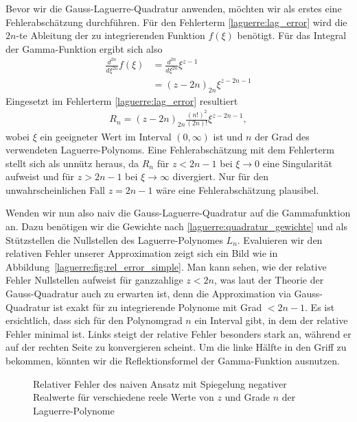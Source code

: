 Bevor wir die Gauss-Laguerre-Quadratur anwenden,
möchten wir als erstes eine Fehlerabschätzung durchführen.
Für den Fehlerterm \eqref{laguerre:lag_error} wird die $2n$-te Ableitung
der zu integrierenden Funktion $f(\xi)$ benötigt.
Für das Integral der Gamma-Funktion ergibt sich also
\begin{align*}
\frac{d^{2n}}{d\xi^{2n}} f(\xi)
 & =
\frac{d^{2n}}{d\xi^{2n}} \xi^{z-1}
\\
 & =
(z - 2n)_{2n} \xi^{z - 2n - 1}
\end{align*}
Eingesetzt im Fehlerterm \eqref{laguerre:lag_error} resultiert
\begin{align*}
R_n
=
(z - 2n)_{2n} \frac{(n!)^2}{(2n)!} \xi^{z-2n-1}
,
\label{laguerre:gamma_err_simple}
\end{align*}
wobei $\xi$ ein geeigneter Wert im Interval $(0, \infty)$ ist
und $n$ der Grad des verwendeten Laguerre-Polynoms.
Eine Fehlerabschätzung mit dem Fehlerterm stellt sich als unnütz heraus,
da $R_n$ für $z < 2n - 1$ bei $\xi \rightarrow 0$ eine Singularität aufweist
und für $z > 2n - 1$ bei $\xi \rightarrow \infty$ divergiert.
Nur für den unwahrscheinlichen Fall $ z = 2n - 1$
wäre eine Fehlerabschätzung plausibel.

Wenden wir nun also naiv die Gauss-Laguerre-Quadratur auf die Gammafunktion an.
Dazu benötigen wir die Gewichte nach
\eqref{laguerre:quadratur_gewichte}
und als Stützstellen die Nullstellen des Laguerre-Polynomes $L_n$.
Evaluieren wir den relativen Fehler unserer Approximation zeigt sich ein
Bild wie in Abbildung~\ref{laguerre:fig:rel_error_simple}.
Man kann sehen,
wie der relative Fehler Nullstellen aufweist für ganzzahlige $z < 2n$,
was laut der Theorie der Gauss-Quadratur auch zu erwarten ist,
denn die Approximation via Gauss-Quadratur
ist exakt für zu integrierende Polynome mit Grad $< 2n-1$.
Es ist ersichtlich,
dass sich für den Polynomgrad $n$ ein Interval gibt,
in dem der relative Fehler minimal ist.
Links steigt der relative Fehler besonders stark an,
während er auf der rechten Seite zu konvergieren scheint.
Um die linke Hälfte in den Griff zu bekommen,
könnten wir die Reflektionsformel der Gamma-Funktion ausnutzen.

\begin{figure}
\centering

\caption{Relativer Fehler des naiven Ansatz mit Spiegelung negativer Realwerte
für verschiedene reele Werte von $z$ und Grade $n$ der Laguerre-Polynome}
\label{laguerre:fig:rel_error_mirror}
\end{figure}

